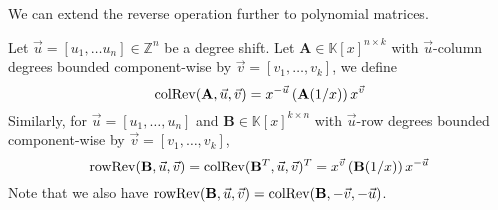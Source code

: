 We can extend the reverse operation further to polynomial matrices.
\begin{defn}
Let $\vec{u}=\left[u_{1},\dots u_{n}\right]\in\mathbb{Z}^{n}$ be
a degree shift. Let $\mathbf{A}\in\mathbb{K}\left[x\right]^{n\times k}$
with $\vec{u}$-column degrees bounded component-wise by $\vec{v}=\left[v_{1},\dots,v_{k}\right]$,
we define 
\[
\operatorname{colRev}(\mathbf{A},\vec{u},\vec{v})=x^{-\vec{u}}\left(\mathbf{A}(1/x)\right)x^{\vec{v}}
\]
 Similarly, for $\vec{u}=\left[u_{1},\dots,u_{n}\right]$ and $\mathbf{B}\in\mathbb{K}\left[x\right]^{k\times n}$
with $\vec{u}$-row degrees bounded component-wise by $\vec{v}=\left[v_{1},\dots,v_{k}\right]$,
\[
\operatorname{rowRev}(\mathbf{B},\vec{u},\vec{v})=\operatorname{colRev}(\mathbf{B}^{T},\vec{u},\vec{v})^{T}=x^{\vec{v}}\left(\mathbf{B}(1/x)\right)x^{-\vec{u}}
\]
 Note that we also have $\operatorname{rowRev}(\mathbf{B},\vec{u},\vec{v})=\operatorname{colRev}(\mathbf{B},-\vec{v},-\vec{u})$.
\end{defn}
